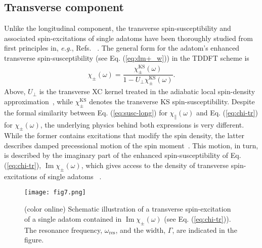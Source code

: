 \documentclass[prb,footinbib,showpacs,twocolumn,amsmath,amssymb]{revtex4}
\renewcommand\Im{\operatorname{Im}}
\newcommand{\bek}{\begin{eqnarray}}
\newcommand{\ek}{\end{eqnarray}}
\begin{document}
\subsection{Transverse component}
\label{subsec:trans}

Unlike the longitudinal component, the transverse spin-susceptibility 
and associated spin-excitations of single adatoms have been thoroughly studied 
from first principles in, \textit{e.g.}, Refs.
~. 
The general form for the adatom's 
enhanced transverse spin-susceptibility (see Eq. (\ref{eq:dm+_w})) 
in the 
TDDFT scheme is
\bek\label{eq:chi-tr}
\chi_{\pm}(\omega)=\dfrac{\chi_{\pm}^{\text{KS}}(\omega)}{1-U_{\perp}\chi^{\text{KS}}_{\pm}(\omega)}.
\ek
Above, $U_{\perp}$ is the transverse XC kernel
treated in the adiabatic local spin-density approximation~\cite{katsnelson_magnetic_2004},
while $\chi_{\pm}^{\text{KS}}$ denotes the transverse KS
spin-susceptibility.
Despite the formal similarity between Eq. (\ref{eq:susc-long}) for $\chi_{\parallel}(\omega)$
and Eq. (\ref{eq:chi-tr}) for $\chi_{\pm}(\omega)$, the underlying physics behind both 
expressions is very different. While the former contains 
excitations that modify the spin density, the latter describes 
damped precessional motion of the spin moment~\cite{white_quantum_2007}.
This motion, in turn, is described by 
the imaginary part of the enhanced spin-susceptibility of Eq. (\ref{eq:chi-tr}),
$\Im\chi_{\pm}(\omega)$, 
which gives access to the density of transverse spin-excitations of  
single adatoms ~\cite{lounis_dynamical_2010,lounis_theory_2011,dias_relativistic_2015,PhysRevB.91.104420,PhysRevB.89.235439,ibanez-azpiroz_zero-point_2016}.



\begin{figure}[t]
\texttt{[image: fig7.png]}
\caption{(color online) Schematic illustration of a transverse spin-excitation of a single adatom contained
in $\Im\chi_{\pm}(\omega)$ (see Eq. (\ref{eq:chi-tr})). The resonance frequency, 
$\omega_{\text{res}}$, and the width, $\Gamma$, are indicated in the figure.
}
\label{fig:t-trans}
\end{figure}
\end{document}

